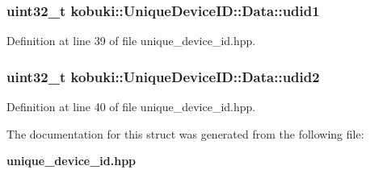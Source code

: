 \subsubsection[{udid1}]{\setlength{\rightskip}{0pt plus 5cm}uint32\-\_\-t {\bf kobuki\-::\-Unique\-Device\-I\-D\-::\-Data\-::udid1}}\label{structkobuki_1_1UniqueDeviceID_1_1Data_a4839939a73f3e7d47f52b7399f6d8047}


\-Definition at line 39 of file unique\-\_\-device\-\_\-id.\-hpp.

\subsubsection[{udid2}]{\setlength{\rightskip}{0pt plus 5cm}uint32\-\_\-t {\bf kobuki\-::\-Unique\-Device\-I\-D\-::\-Data\-::udid2}}\label{structkobuki_1_1UniqueDeviceID_1_1Data_ad8c475aafccda342e444fb6797a53de4}


\-Definition at line 40 of file unique\-\_\-device\-\_\-id.\-hpp.



\-The documentation for this struct was generated from the following file\-:\begin{DoxyCompactItemize}
\item 
{\bf unique\-\_\-device\-\_\-id.\-hpp}\end{DoxyCompactItemize}
